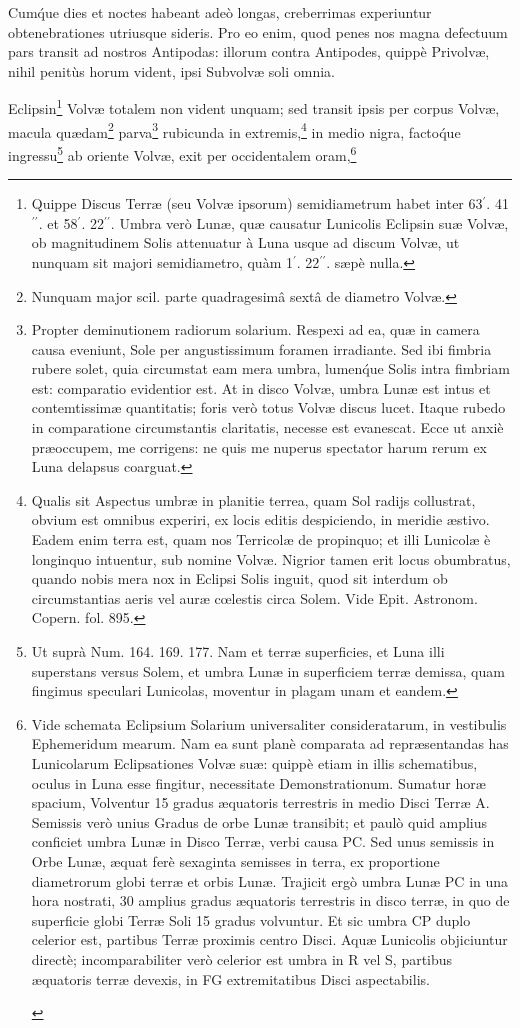 \documentclass[a4paper, 11pt, oneside, polutonikogreek, german]{article}
\begin{document}
Cum\'que dies et noctes habeant adeò longas, creberrimas experiuntur obtenebrationes utriusque sideris. Pro eo enim, quod penes nos magna defectuum pars transit ad nostros Antipodas: illorum contra Antipodes, quippè Privolvæ, nihil penitùs horum vident, ipsi Subvolvæ soli omnia.

Eclipsin\footnote{Quippe Discus Terræ (seu Volvæ ipsorum) semidiametrum habet inter 63$^{\prime}$. 41$^{\prime\prime}$. et 58$^{\prime}$. 22$^{\prime\prime}$. Umbra verò Lunæ, quæ causatur Lunicolis Eclipsin suæ Volvæ, ob magnitudinem Solis attenuatur à Luna usque ad discum Volvæ, ut nunquam sit majori semidiametro, quàm 1$^{\prime}$. 22$^{\prime\prime}$. sæpè nulla.} Volvæ totalem non vident unquam; sed transit ipsis per corpus Volvæ, macula quædam\footnote{Nunquam major scil. parte quadragesimâ sextâ de diametro Volvæ.} parva\footnote{Propter deminutionem radiorum solarium. Respexi ad ea, quæ in camera causa eveniunt, Sole per angustissimum foramen irradiante. Sed ibi fimbria rubere solet, quia circumstat eam mera umbra, lumen\'que Solis intra fimbriam est: comparatio evidentior est. At in disco Volvæ, umbra Lunæ est intus et contemtissimæ quantitatis; foris verò totus Volvæ discus lucet. Itaque rubedo in comparatione circumstantis claritatis, necesse est evanescat. Ecce ut anxiè præoccupem, me corrigens: ne quis me nuperus spectator harum rerum ex Luna delapsus coarguat.} rubicunda in extremis,\footnote{Qualis sit Aspectus umbræ in planitie terrea, quam Sol radijs collustrat, obvium est omnibus experiri, ex locis editis despiciendo, in meridie æstivo. Eadem enim terra est, quam nos Terricolæ de propinquo; et illi Lunicolæ è longinquo intuentur, sub nomine Volvæ. Nigrior tamen erit locus obumbratus, quando nobis mera nox in Eclipsi Solis inguit, quod sit interdum ob circumstantias aeris vel auræ cœlestis circa Solem. Vide Epit. Astronom. Copern. fol. 895.} in medio nigra, facto\'que ingressu\footnote{Ut suprà Num. 164. 169. 177. Nam et terræ superficies, et Luna illi superstans versus Solem, et umbra Lunæ in superficiem terræ demissa, quam fingimus speculari Lunicolas, moventur in plagam unam et eandem.} ab oriente Volvæ, exit per occidentalem oram,\footnote{Vide schemata Eclipsium Solarium universaliter consideratarum, in vestibulis Ephemeridum mearum. Nam ea sunt planè comparata ad repræsentandas has Lunicolarum Eclipsationes Volvæ suæ: quippè etiam in illis schematibus, oculus in Luna esse fingitur, necessitate Demonstrationum. Sumatur horæ spacium, Volventur 15 gradus æquatoris terrestris in medio Disci Terræ A. Semissis verò unius Gradus de orbe Lunæ transibit; et paulò quid amplius conficiet umbra Lunæ in Disco Terræ, verbi causa PC. Sed unus semissis in Orbe Lunæ, æquat ferè sexaginta semisses in terra, ex proportione diametrorum globi terræ et orbis Lunæ. Trajicit ergò umbra Lunæ PC in una hora nostrati, 30 amplius gradus æquatoris terrestris in disco terræ, in quo de superficie globi Terræ Soli 15 gradus volvuntur. Et sic umbra CP duplo celerior est, partibus Terræ proximis centro Disci. Aquæ Lunicolis objiciuntur directè; incomparabiliter verò celerior est umbra in R vel S, partibus æquatoris terræ devexis, in FG extremitatibus Disci aspectabilis.\begin{figure}[H]

\end{figure}}
\end{document}

